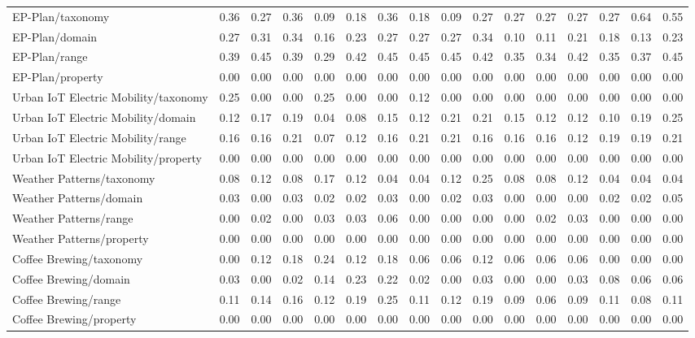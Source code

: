 \begin{tabular}{lccccccccccccccc}
EP-Plan/taxonomy & 0.36 & 0.27 & 0.36 & 0.09 & 0.18 & 0.36 & 0.18 & 0.09 & 0.27 & 0.27 & 0.27 & 0.27 & 0.27 & 0.64 & 0.55 \\
EP-Plan/domain & 0.27 & 0.31 & 0.34 & 0.16 & 0.23 & 0.27 & 0.27 & 0.27 & 0.34 & 0.10 & 0.11 & 0.21 & 0.18 & 0.13 & 0.23 \\
EP-Plan/range & 0.39 & 0.45 & 0.39 & 0.29 & 0.42 & 0.45 & 0.45 & 0.45 & 0.42 & 0.35 & 0.34 & 0.42 & 0.35 & 0.37 & 0.45 \\
EP-Plan/property & 0.00 & 0.00 & 0.00 & 0.00 & 0.00 & 0.00 & 0.00 & 0.00 & 0.00 & 0.00 & 0.00 & 0.00 & 0.00 & 0.00 & 0.00 \\
Urban IoT Electric Mobility/taxonomy & 0.25 & 0.00 & 0.00 & 0.25 & 0.00 & 0.00 & 0.12 & 0.00 & 0.00 & 0.00 & 0.00 & 0.00 & 0.00 & 0.00 & 0.00 \\
Urban IoT Electric Mobility/domain & 0.12 & 0.17 & 0.19 & 0.04 & 0.08 & 0.15 & 0.12 & 0.21 & 0.21 & 0.15 & 0.12 & 0.12 & 0.10 & 0.19 & 0.25 \\
Urban IoT Electric Mobility/range & 0.16 & 0.16 & 0.21 & 0.07 & 0.12 & 0.16 & 0.21 & 0.21 & 0.16 & 0.16 & 0.16 & 0.12 & 0.19 & 0.19 & 0.21 \\
Urban IoT Electric Mobility/property & 0.00 & 0.00 & 0.00 & 0.00 & 0.00 & 0.00 & 0.00 & 0.00 & 0.00 & 0.00 & 0.00 & 0.00 & 0.00 & 0.00 & 0.00 \\
Weather Patterns/taxonomy & 0.08 & 0.12 & 0.08 & 0.17 & 0.12 & 0.04 & 0.04 & 0.12 & 0.25 & 0.08 & 0.08 & 0.12 & 0.04 & 0.04 & 0.04 \\
Weather Patterns/domain & 0.03 & 0.00 & 0.03 & 0.02 & 0.02 & 0.03 & 0.00 & 0.02 & 0.03 & 0.00 & 0.00 & 0.00 & 0.02 & 0.02 & 0.05 \\
Weather Patterns/range & 0.00 & 0.02 & 0.00 & 0.03 & 0.03 & 0.06 & 0.00 & 0.00 & 0.00 & 0.00 & 0.02 & 0.03 & 0.00 & 0.00 & 0.00 \\
Weather Patterns/property & 0.00 & 0.00 & 0.00 & 0.00 & 0.00 & 0.00 & 0.00 & 0.00 & 0.00 & 0.00 & 0.00 & 0.00 & 0.00 & 0.00 & 0.00 \\
Coffee Brewing/taxonomy & 0.00 & 0.12 & 0.18 & 0.24 & 0.12 & 0.18 & 0.06 & 0.06 & 0.12 & 0.06 & 0.06 & 0.06 & 0.00 & 0.00 & 0.00 \\
Coffee Brewing/domain & 0.03 & 0.00 & 0.02 & 0.14 & 0.23 & 0.22 & 0.02 & 0.00 & 0.03 & 0.00 & 0.00 & 0.03 & 0.08 & 0.06 & 0.06 \\
Coffee Brewing/range & 0.11 & 0.14 & 0.16 & 0.12 & 0.19 & 0.25 & 0.11 & 0.12 & 0.19 & 0.09 & 0.06 & 0.09 & 0.11 & 0.08 & 0.11 \\
Coffee Brewing/property & 0.00 & 0.00 & 0.00 & 0.00 & 0.00 & 0.00 & 0.00 & 0.00 & 0.00 & 0.00 & 0.00 & 0.00 & 0.00 & 0.00 & 0.00 \\

\end{tabular}
